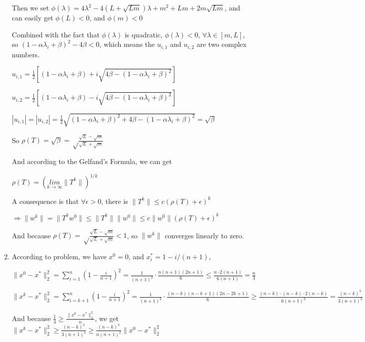 \documentclass[12pt]{article}
\begin{document}
\begin{enumerate}
Then we set $\phi(\lambda) = 4 \lambda^2 -4(L+\sqrt{Lm})\lambda + m^2 +Lm + 2m\sqrt{Lm}$, and can easily get $\phi(L) < 0$, and $\phi(m) < 0$

Combined with the fact that $\phi(\lambda)$ is quadratic, $\phi(\lambda) < 0$, $\forall \lambda \in [m, L]$, so $(1 - \alpha \lambda_i + \beta)^2 - 4 \beta < 0$, which means the $u_{i,1}$ and $u_{i,2}$ are two complex numbers.

$u_{i,1} = \frac{1}{2} [(1 - \alpha \lambda_i + \beta) + i \sqrt{4 \beta - (1 - \alpha \lambda_i + \beta)^2}] $

$u_{i,2} = \frac{1}{2} [(1 - \alpha \lambda_i + \beta) - i \sqrt{4 \beta - (1 - \alpha \lambda_i + \beta)^2}] $

$| u_{i,1} | = | u_{i,2} | = \frac{1}{2} \sqrt{(1 - \alpha \lambda_i + \beta)^2 + 4 \beta - (1 - \alpha \lambda_i + \beta)^2 } = \sqrt\beta $

So $\rho(T) = \sqrt\beta = \sqrt\frac{\sqrt{L} - \sqrt{m}}{\sqrt{L} + \sqrt{m}}$

And according to the Gelfand's Formula, we can get

$\rho(T) = (\underset{k\to\infty}{lim}\|T^k\|)^{{1}/{k}}$

A consequence is that $\forall \epsilon > 0$, there is $\|T^k\| \le c(\rho(T) + \epsilon )^k$

$\Longrightarrow \|w^k\| = \|T^k w^0\| \le \|T^k\| \|w^0\| \le c \|w^0\| (\rho(T) + \epsilon )^k$

And because $\rho(T) = \sqrt\frac{\sqrt{L} - \sqrt{m}}{\sqrt{L} + \sqrt{m}} < 1$, so $\|w^k\|$ converges linearly to zero.

\bigskip












\item

According to problem, we have $x^0=0$, and $x_i^* = 1 - i / (n+1)$,

$\| x^0 - x^*\|^2_2 = \sum_{i=1}^n (1-\frac{i}{n+1})^2 = \frac{1}{(n+1)^2} \cdot \frac{n(n+1)(2n+1)}{6} \le \frac{n \cdot 2(n+1)}{6(n+1)} = \frac{n}{3}$

$\| x^k - x^* \|^2_2 = \sum_{i=k+1}^n (1-\frac{i}{n+1})^2 = \frac{1}{(n+1)^2} \cdot \frac{(n-k)(n-k+1)(2n-2k+1)}{6} \ge \frac{(n-k)\cdot (n-k) \cdot 2(n-k)}{6(n+1)^2} = \frac{(n-k)^3}{3(n+1)^2}$

And because $\frac{1}{3} \ge \frac{\| x^0 - x^*\|^2_2}{n}$, we get $\| x^k - x^* \|^2_2 \ge \frac{(n-k)^3}{3(n+1)^2} \ge \frac{(n-k)^3}{n(n+1)^2}\| x^0 - x^*\|^2_2$

\end{enumerate}
\end{document}

